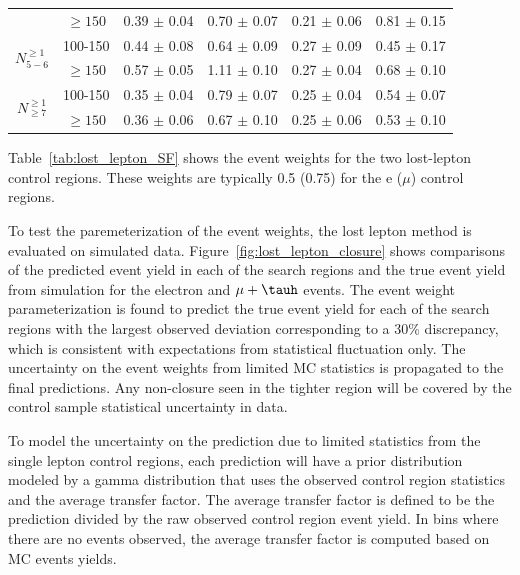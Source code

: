 \begin{table}
\begin{tabular}{c|c|c|c|c|c}
                          & $\geq 150$ & 0.39 $\pm$ 0.04 & 0.70 $\pm$ 0.07  & 0.21 $\pm$ 0.06 & 0.81 $\pm$ 0.15 \\ \cline{1-6}
\multirow{2}{*}{$N_{5-6}^{\geq 1}$}& 100-150    & 0.44 $\pm$ 0.08 & 0.64 $\pm$ 0.09  & 0.27 $\pm$ 0.09 & 0.45 $\pm$ 0.17 \\ \cline{2-6}
						  & $\geq 150$ & 0.57 $\pm$ 0.05 & 1.11 $\pm$ 0.10  & 0.27 $\pm$ 0.04 & 0.68 $\pm$ 0.10 \\ \cline{1-6}
\multirow{2}{*}{$N_{\geq 7}^{\geq 1}$} & 100-150    & 0.35 $\pm$ 0.04 & 0.79 $\pm$ 0.07  & 0.25 $\pm$ 0.04 & 0.54 $\pm$ 0.07 \\ \cline{2-6}
                          & $\geq 150$ & 0.36 $\pm$ 0.06 & 0.67 $\pm$ 0.10  & 0.25 $\pm$ 0.06 & 0.53 $\pm$ 0.10 \\\hline
\end{tabular}
\end{table}

Table~\ref{tab:lost_lepton_SF} shows the event weights for the two lost-lepton control regions.
These weights are typically 0.5 (0.75) for the e ($\mu$) control regions. 

To test the paremeterization of the event weights, the lost lepton method is evaluated 
on simulated data.  Figure~\ref{fig:lost_lepton_closure} shows comparisons of the predicted event yield
in each of the search regions and the true event yield from simulation for the electron
and $\mu+\tauh$ events.  The event weight parameterization is found to 
predict the true event yield for each of the search regions with the largest observed
deviation corresponding to a 30\% discrepancy, which is consistent with expectations
from statistical fluctuation only. 
The uncertainty on the event weights from limited MC statistics is propagated to the final predictions.
Any non-closure seen in the tighter \ptmiss region will be covered by the control sample statistical uncertainty in data.

To model the uncertainty on the prediction due to limited statistics from the single 
lepton control regions, each prediction will have a prior distribution modeled by
a gamma distribution that uses the observed control region statistics and the average 
transfer factor.  The average transfer factor is defined to be the prediction 
divided by the raw observed control region event yield.  In bins where there are
no events observed, the average transfer factor is computed based on MC events 
yields.  

